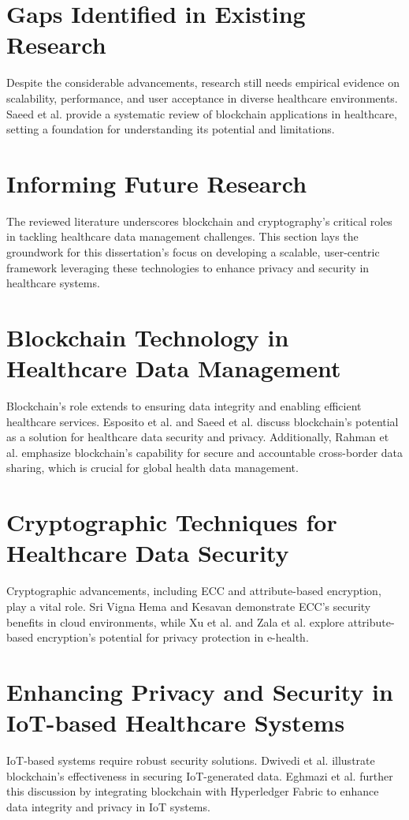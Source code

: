 \documentclass[cic,tc,english]{iiufrgs}
\begin{document}
\section{Gaps Identified in Existing Research}
Despite the considerable advancements, research still needs empirical evidence on scalability, performance, and user acceptance in diverse healthcare environments. Saeed et al. \cite{Saeed2022} provide a systematic review of blockchain applications in healthcare, setting a foundation for understanding its potential and limitations.

\section{Informing Future Research}
The reviewed literature underscores blockchain and cryptography's critical roles in tackling healthcare data management challenges. This section lays the groundwork for this dissertation's focus on developing a scalable, user-centric framework leveraging these technologies to enhance privacy and security in healthcare systems.

\section{Blockchain Technology in Healthcare Data Management}
Blockchain's role extends to ensuring data integrity and enabling efficient healthcare services. Esposito et al. \cite{Esposito2018} and Saeed et al. \cite{Saeed2022} discuss blockchain's potential as a solution for healthcare data security and privacy. Additionally, Rahman et al. \cite{mohammad2020} emphasize blockchain's capability for secure and accountable cross-border data sharing, which is crucial for global health data management.

\section{Cryptographic Techniques for Healthcare Data Security}
Cryptographic advancements, including ECC and attribute-based encryption, play a vital role. Sri Vigna Hema and Kesavan \cite{sri2019} demonstrate ECC's security benefits in cloud environments, while Xu et al. \cite{Xu2019} and Zala et al. \cite{Zala2024} explore attribute-based encryption's potential for privacy protection in e-health.

\section{Enhancing Privacy and Security in IoT-based Healthcare Systems}
IoT-based systems require robust security solutions. Dwivedi et al. \cite{Dwivedi2019} illustrate blockchain's effectiveness in securing IoT-generated data. Eghmazi et al. \cite{Eghmazi2024} further this discussion by integrating blockchain with Hyperledger Fabric to enhance data integrity and privacy in IoT systems.
\end{document}
